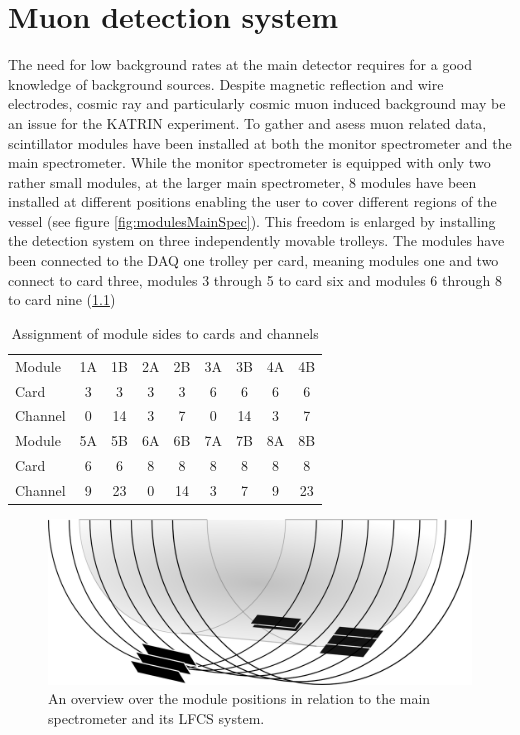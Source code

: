 
\chapter{Muon detection system}
\label{ch:The muon detection system}
  The need for low background rates at the main detector requires for a good knowledge of background sources. Despite magnetic reflection and wire electrodes, cosmic ray and particularly cosmic muon induced background may be an issue for the KATRIN experiment. To gather and asess muon related data, scintillator modules have been installed at both the monitor spectrometer and the main spectrometer. While the monitor spectrometer is equipped with only two rather small modules, at the larger main spectrometer, 8 modules have been installed at different positions enabling the user to cover different regions of the vessel (see figure \ref{fig:modulesMainSpec}). This freedom is enlarged by installing the detection system on three independently movable trolleys.
  The modules have been connected to the DAQ one trolley per card, meaning modules one and two connect to card three, modules 3 through 5 to card six and modules 6 through 8 to card nine (\ref{tab:connectionsModulesCards})
  \begin{table}
  	\centering
  	\begin{tabular}{| l | c c | c c | c c | c c |}
  	\hline
  		Module	& 1A	& 1B	& 2A	& 2B	& 3A	& 3B	& 4A	& 4B 	\\
  		Card	& 3	& 3	& 3	& 3	& 6	& 6	& 6	& 6	\\
  		Channel	& 0	& 14	& 3	& 7	& 0	& 14	& 3	& 7	\\
  		\hline \hline
  		Module	&5A	& 5B	& 6A	& 6B	& 7A	& 7B	& 8A	& 8B	\\
  		Card	& 6	& 6	& 8	& 8	& 8	& 8	& 8	& 8	\\
  		Channel	& 9	& 23	& 0	& 14	& 3	& 7	& 9	& 23	\\
  		\hline
  	\end{tabular}
  	\caption[Channel assignment]{Assignment of module sides to cards and channels}
  	\label{tab:connectionsModulesCards}
  \end{table}
  \begin{figure}
  	\centering
  	\includegraphics[width = 0.9 \textwidth]{graphics/muonModules/mainSpec/panelsMainSpec.png}
  	\caption[Module locations]{An overview over the module positions in relation to the main spectrometer and its LFCS system. }
  \end{figure}

